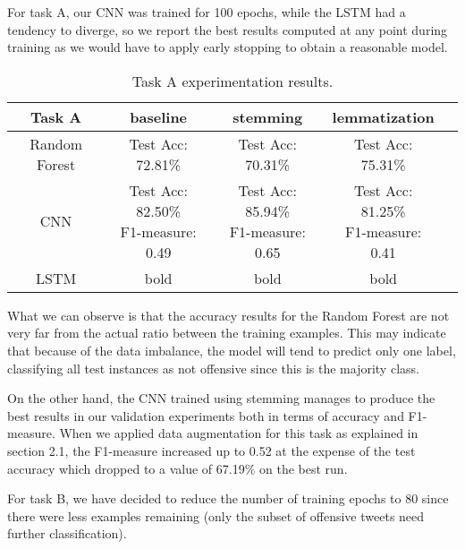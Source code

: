 \documentclass[11pt,a4paper]{article}
\begin{document}
For task A, our CNN was trained for 100 epochs, while the LSTM had a tendency to diverge, so we report the best results computed at any point during training as we would have to apply early stopping to obtain a reasonable model.

\begin{table*}[!htp]
\begin{center}
\begin{tabular}{|c|cccc|}
\hline \bf Task A & \bf baseline & \bf stemming & \bf lemmatization & \\ \hline
Random Forest & Test Acc: 72.81\% & Test Acc: 70.31\% & Test Acc: 75.31\% & \\ \hline
CNN & \shortstack{Test Acc: 82.50\% \\ F1-measure: 0.49}  & \shortstack{Test Acc: 85.94\% \\ F1-measure: 0.65} & \shortstack{Test Acc: 81.25\% \\ F1-measure: 0.41} & \\ \hline
LSTM & bold & bold & bold & \\
\hline
\end{tabular}
\end{center}
\caption{\label{font-table} Task A experimentation results. }
\label{table:1}
\end{table*}

What we can observe is that the accuracy results for the Random Forest are not very far from the actual ratio between the training examples. This may indicate that because of the data imbalance, the model will tend to predict only one label, classifying all test instances as not offensive since this is the majority class.

On the other hand, the CNN trained using stemming manages to produce the best results in our validation experiments both in terms of accuracy and F1-measure. When we applied data augmentation for this task as explained in section 2.1, the F1-measure increased up to 0.52 at the expense of the test accuracy which dropped to a value of 67.19\% on the best run.

For task B, we have decided to reduce the number of training epochs to 80 since there were less examples remaining (only the subset of offensive tweets need further classification).
\end{document}
